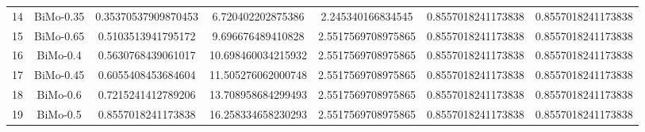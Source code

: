 \documentclass[a4paper,10pt]{article}
\begin{document}
\begin{landscape}
\begin{table}[!htp]
\begin{tabular}{ccccccc}
14&BiMo-0.35&0.35370537909870453&6.720402202875386&2.245340166834545&0.8557018241173838&0.8557018241173838\\
15&BiMo-0.65&0.5103513941795172&9.696676489410828&2.5517569708975865&0.8557018241173838&0.8557018241173838\\
16&BiMo-0.4&0.5630768439061017&10.698460034215932&2.5517569708975865&0.8557018241173838&0.8557018241173838\\
17&BiMo-0.45&0.6055408453684604&11.505276062000748&2.5517569708975865&0.8557018241173838&0.8557018241173838\\
18&BiMo-0.6&0.7215241412789206&13.708958684299493&2.5517569708975865&0.8557018241173838&0.8557018241173838\\
19&BiMo-0.5&0.8557018241173838&16.258334658230293&2.5517569708975865&0.8557018241173838&0.8557018241173838\\
\hline
\end{tabular}
\end{table}


\end{landscape}
\end{document}
